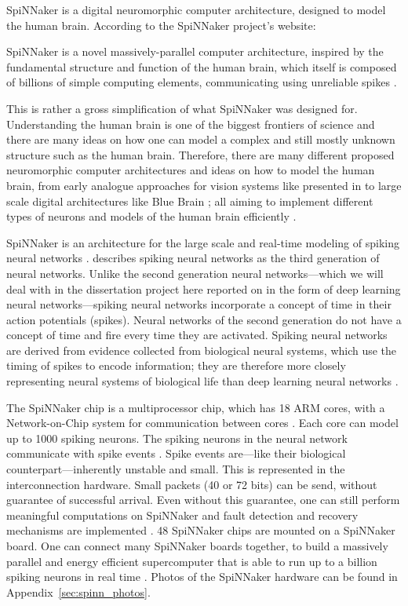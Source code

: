 \documentclass{article}
\begin{document}
SpiNNaker is a digital neuromorphic computer architecture,
designed to model the human brain.
According to the SpiNNaker project's website:
\begin{displayquote}
  SpiNNaker is a novel massively-parallel computer
  architecture, inspired by the fundamental structure and
  function of the human brain, which itself is composed of
  billions of simple computing elements, communicating
  using unreliable spikes \citep{spinn_proj}.
\end{displayquote}
This is rather a gross simplification of what SpiNNaker was
designed for.
Understanding the human brain is one of the biggest
frontiers of science and there are many ideas on how one
can model a complex and still mostly unknown structure such
as the human brain.
Therefore, there are many different proposed neuromorphic
computer architectures and ideas on how to model the human
brain, from early analogue approaches for vision systems
like presented in \citet{mead1989} to large scale digital
architectures like Blue Brain \citep{markram2006}; all
aiming to implement different types of neurons and models
of the human brain efficiently \citep{furber_et_al_2007}.

SpiNNaker is an architecture for the large scale and
real-time modeling of spiking neural networks
\citep{furber_et_al_2006, furber_et_al_2006b,
  furber_et_al_2007}.
\citet{maass1997} describes spiking neural networks as the
third generation of neural networks.
Unlike the second generation neural networks---which we
will deal with in the dissertation project here reported on
in the form of deep learning neural networks---spiking
neural networks incorporate a concept of time in their
action potentials (spikes).
Neural networks of the second generation do not have a
concept of time and fire every time they are activated.
Spiking neural networks are derived from evidence
collected from biological neural systems, which use the timing of
spikes to encode information; they are therefore more closely
representing neural systems of biological life than deep learning
neural networks \citep{maass1997}.

The SpiNNaker chip is a multiprocessor chip, which has 18 ARM
cores, with a Network-on-Chip system for
communication between cores \citep{furber_et_al_2007,
  spinn_proj}.
Each core can model up to 1000 spiking neurons.
The spiking neurons in the neural network communicate with
spike events \citep{furber_et_al_2007}.
Spike events are---like their biological
counterpart---inherently unstable and small.
This is represented in the interconnection hardware.
Small packets (40 or 72 bits) can be send, without
guarantee of successful arrival.
Even without this guarantee, one can still perform
meaningful computations on SpiNNaker and fault detection
and recovery mechanisms are implemented \citep{spinn_proj}.
48 SpiNNaker chips are mounted on a SpiNNaker board.
One can connect many SpiNNaker boards together, to build a
massively parallel and energy efficient supercomputer that
is able to run up to a billion spiking neurons in real time
\citep{furber_et_al_2007}.
Photos of the SpiNNaker hardware can be found in
Appendix~\ref{sec:spinn_photos}.
\end{document}
